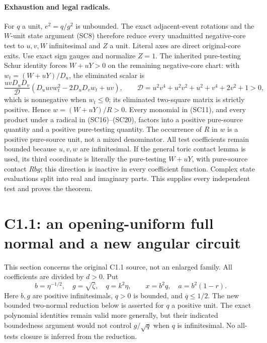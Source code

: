 \paragraph{Exhaustion and legal radicals.}
For $q$ a unit, $e^2=q/g^2$ is unbounded. The exact adjacent-event
rotations and the $W$-unit state argument (SC8) therefore reduce every
unadmitted negative-core test to $u,v,W$ infinitesimal and $Z$ a unit.
Literal axes are direct original-core exits. Use exact sign gauges and
normalize $Z=1$. The inherited pure-testing Schur identity forces
$W+uY>0$ on the remaining negative-core chart: with
$w_t=(W+uY)/D_u$, the eliminated scalar is
\[
 \frac{uvD_uD_v}{\mathcal D}
       (D_uuv w_t^2-2D_uD_vw_t+uv),\qquad
 \mathcal D=u^2v^4+u^2v^2+u^2+v^4+2v^2+1>0,
\]
which is nonnegative when $w_t\le0$; its eliminated two-square
matrix is strictly positive. Hence $w=(W+uY)/R>0$.
Every monomial in (SC11), and every product under a radical in
(SC16)--(SC20), factors into a positive pure-source quantity and a
positive pure-testing quantity. The occurrence of $R$ in $w$ is a
positive pure-source unit, not a mixed denominator. All test
coefficients remain bounded because $u,v,w$ are infinitesimal.
If the general toric contact lemma is used, its third coordinate
is literally the pure-testing $W+uY$, with pure-source contact
$Rbg$; this direction is inactive in every coefficient function.
Complex state evaluations split into real and imaginary parts.
This supplies every independent test and proves the theorem.



\section{\texorpdfstring{C1.1: an opening-uniform full normal and a new angular circuit}{C1.1: an opening-uniform full normal and a new angular circuit}}
\label{component:p9afbe73899af}

\label{p9afbe73899af:sec:r7-c1-small}
This section concerns the original C1.1 source, not an enlarged family.
All coefficients are divided by $d>0$. Put
\[
 b=\eta^{-1/2},\quad g=\sqrt\zeta,\quad q=k^2\eta,
 \qquad x=b^2q,\quad a=b^2(1-r).
 \tag{SC1}
\]
Here $b,g$ are positive infinitesimals, $q>0$ is bounded, and
$\overline q\le1/2$. The new bounded two-normal reduction below is
asserted for $q$ a positive unit. The exact polynomial identities
remain valid more generally, but their indicated boundedness argument
would not control $g/\sqrt q$ when $q$ is infinitesimal.
No all-tests closure is inferred from the reduction.

